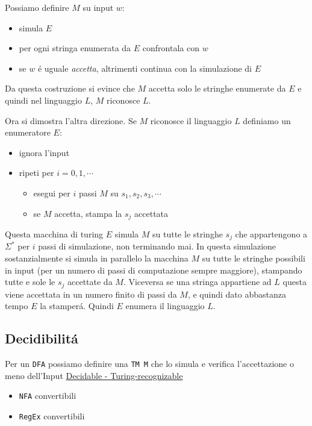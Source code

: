 \documentclass[11pt]{article}
\begin{document}
Possiamo definire \(M\) su input \(w\):
\begin{itemize}
\item simula \(E\)
\item per ogni stringa enumerata da \(E\) confrontala con \(w\)
\item se \(w\) é uguale \emph{accetta}, altrimenti continua con la simulazione di \(E\)
\end{itemize}

Da questa costruzione si evince che \(M\) accetta solo le stringhe enumerate da \(E\) e quindi nel linguaggio \(L\), \(M\) riconosce \(L\).

Ora si dimostra l'altra direzione. Se \(M\) riconosce il linguaggio \(L\) definiamo un enumeratore \(E\):
\begin{itemize}
\item ignora l'input
\item ripeti per \(i=0,1,\cdots\)
\begin{itemize}
\item esegui per \(i\) passi \(M\) su \(s_1,s_2,s_3,\cdots\)
\item se \(M\) accetta, stampa la \(s_j\) accettata
\end{itemize}
\end{itemize}

Questa macchina di turing \(E\) simula \(M\) su tutte le stringhe \(s_j\) che appartengono a \(\Sigma^*\) per \(i\) passi di simulazione, non terminando mai.
In questa simulazione sostanzialmente si simula in parallelo la macchina \(M\) su tutte le stringhe possibili in input (per un numero di passi di computazione sempre maggiore), stampando tutte e sole le \(s_j\) accettate da \(M\).
Viceversa se una stringa appartiene ad \(L\) questa viene accettata in un numero finito di passi da \(M\), e quindi dato abbastanza tempo \(E\) la stamperá. Quindi \(E\) enumera il linguaggio \(L\).

\subsection{Decidibilitá}
\label{sec:org2c4342b}
Per un \texttt{DFA} possiamo definire una \texttt{TM M} che lo simula e verifica l'accettazione o meno dell'Input
\href{../media/img/decidable-recognizable.jpg}{Decidable - Turing-recognizable}
\begin{itemize}
\item \texttt{NFA} convertibili
\item \texttt{RegEx} convertibili
\end{itemize}
\end{document}
